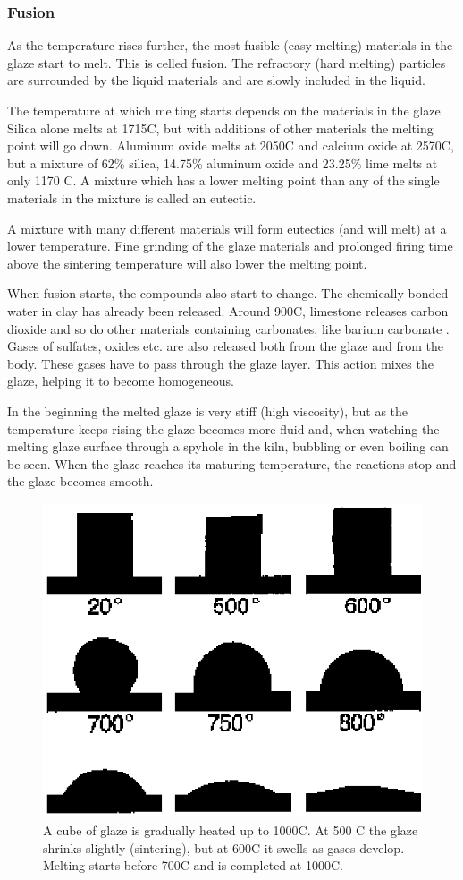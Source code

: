 \subsubsection{Fusion}
As the temperature rises further, the most fusible (easy melting) materials in 
the glaze start to melt. This is celled fusion. The refractory (hard melting) 
particles are surrounded by the liquid materials and are slowly included in the 
liquid.

The temperature at which melting starts depends on the materials in the glaze. 
Silica alone melts at 1715\degree C, but with additions of other materials the 
melting point will go down. Aluminum oxide  melts at 2050\degree C 
and calcium oxide  at 2570\degree C, but a mixture of 62\% 
silica, 14.75\% aluminum oxide and 23.25\% lime melts at only 1170\degree 
C. A mixture which has a lower melting point than any of the single materials 
in the mixture is called an eutectic.

A mixture with many different materials will form eutectics (and will melt) at 
a lower temperature. Fine grinding of the glaze materials and prolonged firing 
time above the sintering temperature will also lower the melting point.

When fusion starts, the compounds also start to change. The chemically bonded 
water in clay has already been released. Around 900\degree C, limestone 
 releases carbon dioxide  and so do other materials 
containing carbonates, like barium carbonate . Gases of sulfates, 
oxides etc. are also released both from the glaze and from the body. These 
gases have to pass through the glaze layer. This action mixes the glaze, 
helping it to become homogeneous.

In the beginning the melted glaze is very stiff (high viscosity), but as the 
temperature keeps rising the glaze becomes more fluid and, when watching the 
melting glaze surface through a spyhole in the kiln, bubbling or even boiling 
can be seen. When the glaze reaches its maturing temperature, the reactions 
stop and the glaze becomes smooth.
\begin{figure}[htbp!]
\centering
\includegraphics[width=0.5\linewidth]{img/fusion.eps}
\caption{A cube of glaze is gradually heated up to 1000\degree C. At 500\degree 
C the glaze shrinks slightly (sintering), but at 600\degree C it swells as 
gases develop. Melting starts before 700\degree C and is completed at 
1000\degree C.}
\label{fig:fusion}
\end{figure}
